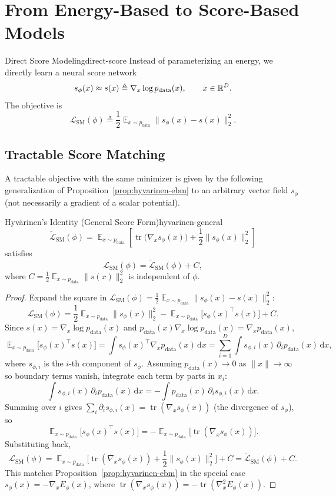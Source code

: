 \documentclass[11pt,a4paper]{article}
\newcommand{\wt}{\widetilde}
\renewcommand{\tilde}{\wt}
\renewcommand{\d}{\mathrm{d}}
\DeclareMathOperator*{\E}{\mathbb{E}}
\DeclareMathOperator{\tr}{tr}
\newcommand{\pdata}{p_{\mathrm{data}}}
\newcommand{\Ephi}{E_{\phi}}
\begin{document}
\section{From Energy-Based to Score-Based Models}\label{sec:score-based}

\begin{definition}{Direct Score Modeling}{direct-score}
Instead of parameterizing an energy, we directly learn a neural score network
\[
s_{\phi}(x)\approx s(x)\triangleq \nabla_x\log \pdata(x),\qquad x\in\R^D.
\]
The objective is
\[
\mathcal{L}_{\mathrm{SM}}(\phi)
\triangleq
\frac12 \E_{x\sim\pdata}\|s_{\phi}(x)-s(x)\|_2^2.
\]
\end{definition}

\subsection{Tractable Score Matching}

A tractable objective with the same minimizer is given by the following generalization of Proposition~\ref{prop:hyvarinen-ebm} to an arbitrary vector field $s_{\phi}$ (not necessarily a gradient of a scalar potential).

\begin{proposition}{Hyv\"arinen's Identity (General Score Form)}{hyvarinen-general}
\[
\tilde{\mathcal{L}}_{\mathrm{SM}}(\phi)
=
\E_{x\sim\pdata}
\left[
\tr\!\big(\nabla_x s_{\phi}(x)\big)
+\frac12\|s_{\phi}(x)\|_2^2
\right]
\]
satisfies
\[
\mathcal{L}_{\mathrm{SM}}(\phi)=\tilde{\mathcal{L}}_{\mathrm{SM}}(\phi)+C,
\]
where $C=\frac12\E_{x\sim\pdata}\|s(x)\|_2^2$ is independent of $\phi$.
\end{proposition}

\begin{proof}
Expand the square in $\mathcal{L}_{\mathrm{SM}}(\phi)=\frac12\E_{x\sim\pdata}\|s_{\phi}(x)-s(x)\|_2^2$:
\[
\mathcal{L}_{\mathrm{SM}}(\phi)
=\frac12\E_{x\sim\pdata}\|s_{\phi}(x)\|_2^2
-\E_{x\sim\pdata}\big[s_{\phi}(x)^\top s(x)\big]+C.
\]
Since $s(x)=\nabla_x\log\pdata(x)$ and $\pdata(x)\nabla_x\log\pdata(x)=\nabla_x\pdata(x)$,
\[
\E_{x\sim\pdata}\big[s_{\phi}(x)^\top s(x)\big]
=\int s_{\phi}(x)^\top \nabla_x\pdata(x)\,\d x
=\sum_{i=1}^{D}\int s_{\phi,i}(x)\,\partial_i \pdata(x)\,\d x,
\]
where $s_{\phi,i}$ is the $i$-th component of $s_{\phi}$. Assuming $\pdata(x)\to0$ as $\|x\|\to\infty$ so boundary terms vanish, integrate each term by parts in $x_i$:
\[
\int s_{\phi,i}(x)\,\partial_i\pdata(x)\,\d x
=-\int \pdata(x)\,\partial_i s_{\phi,i}(x)\,\d x.
\]
Summing over $i$ gives $\sum_i \partial_i s_{\phi,i}(x)=\tr(\nabla_x s_{\phi}(x))$ (the divergence of $s_\phi$), so
\[
\E_{x\sim\pdata}\big[s_{\phi}(x)^\top s(x)\big]
=-\E_{x\sim\pdata}\big[\tr(\nabla_x s_{\phi}(x))\big].
\]
Substituting back,
\[
\mathcal{L}_{\mathrm{SM}}(\phi)
=\E_{x\sim\pdata}\Big[\tr(\nabla_x s_{\phi}(x))+\frac12\|s_{\phi}(x)\|_2^2\Big]+C
=\tilde{\mathcal{L}}_{\mathrm{SM}}(\phi)+C.
\]
This matches Proposition~\ref{prop:hyvarinen-ebm} in the special case $s_{\phi}(x)=-\nabla_x\Ephi(x)$, where $\tr(\nabla_x s_{\phi}(x))=-\tr(\nabla_x^2\Ephi(x))$.
\end{proof}
\end{document}

